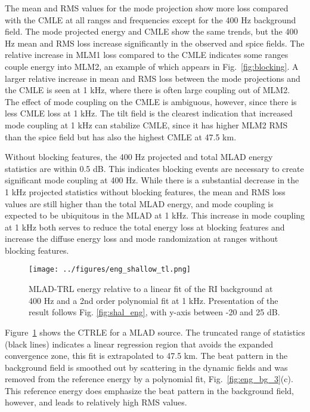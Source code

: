 \documentclass[preprint,NumberedRefs]{JASA}
\begin{document}
The mean and RMS values for the mode projection show more loss compared with the CMLE at all ranges and frequencies except for the 400 Hz background field. The mode projected energy and CMLE show the same trends, but the 400 Hz mean and RMS loss increase significantly in the observed and spice fields. The relative increase in MLM1 loss compared to the CMLE indicates some ranges couple energy into MLM2, an example of which appears in Fig.~\ref{fig:blocking}. A larger relative increase in mean and RMS loss between the mode projections and the CMLE is seen at 1 kHz, where there is often large coupling out of MLM2. The effect of mode coupling on the CMLE is ambiguous, however, since there is less CMLE loss at 1 kHz. The tilt field is the clearest indication that increased mode coupling at 1 kHz can stabilize CMLE, since it has higher MLM2 RMS than the spice field but has also the highest CMLE at 47.5 km.

Without blocking features, the 400 Hz projected and total MLAD energy statistics are within 0.5 dB. This indicates blocking events are necessary to create significant mode coupling at 400 Hz. While there is a substantial decrease in the 1 kHz projected statistics without blocking features, the mean and RMS loss values are still higher than the total MLAD energy, and mode coupling is expected to be ubiquitous in the MLAD at 1 kHz. This increase in mode coupling at 1 kHz both serves to reduce the total energy loss at blocking features and increase the diffuse energy loss and mode randomization at ranges without blocking features.

\begin{figure}
\texttt{[image: ../figures/eng\_shallow\_tl.png]}
        \caption{MLAD-TRL energy relative to a linear fit of the RI background at 400 Hz and a 2nd order polynomial fit at 1 kHz. Presentation of the result follows Fig. \ref{fig:shal_eng}, with y-axis between -20 and 25 dB.}
    \label{fig:eng_tl}
\end{figure}
Figure~\ref{fig:eng_tl} shows the CTRLE for a MLAD source. The truncated range of statistics (black lines) indicates a linear regression region that avoids the expanded convergence zone, this fit is extrapolated to 47.5 km. The beat pattern in the background field is smoothed out by scattering in the dynamic fields and was removed from the reference energy by a polynomial fit, Fig.~\ref{fig:eng_bg_3}(c). This reference energy does emphasize the beat pattern in the background field, however, and leads to relatively high RMS values.
\end{document}
